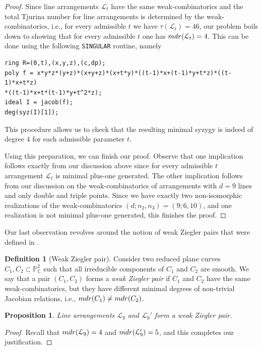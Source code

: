 \documentclass[12pt]{article}
\theoremstyle{plain}
\newtheorem{proposition}[thm]{Proposition}
\theoremstyle{definition}
\newtheorem{definition}[thm]{Definition}
\begin{document}
\begin{proof}
Since line arrangements $\mathcal{L}_{t}$ have the same weak-combinatorics and the total Tjurina number for line arrangements is determined by the weak-combinatorics, i.e., for every admissible $t$ we have $\tau(\mathcal{L}_{t})=46$, our problem boils down to showing that for every admissible $t$ one has ${\rm mdr}(\mathcal{L}_{t}) = 4$. This can be done using the following \verb}SINGULAR} routine, namely
\begin{verbatim}
ring R=(0,t),(x,y,z),(c,dp);
poly f = x*y*z*(y+z)*(x+y+z)*(x+t*y)*((t-1)*x+(t-1)*y+t*z)*((t-1)*x+t*z)
*((t-1)*x+t*(t-1)*y+t^2*z);
ideal I = jacob(f);
deg(syz(I)[1]);
\end{verbatim}
This procedure allows us to check that the resulting minimal syzygy is indeed of degree $4$ for each admissible parameter $t$. 

Using this preparation, we can finish our proof. Observe that one implication follows exactly from our discussion above since for every admissible $t$ arrangement $\mathcal{L}_{t}$ is minimal plus-one generated. The other implication follows from our discussion on the weak-combinatorics of arrangements with $d=9$ lines and only double and triple points. Since we have exactly two non-isomorphic realizations of the weak-combinatorics $(d;n_{2},n_{3}) = (9;6,10)$, and one realization is not minimal plus-one generated, this finishes the proof.
\end{proof}
Our last observation revolves around the notion of weak Ziegler pairs that were defined in \cite{Pokora}.

\begin{definition}[Weak Ziegler pair]
Consider two reduced plane curves $C_{1}, C_{2} \subset \mathbb{P}^{2}_{\mathbb{C}}$ such that all irreducible components of $C_{1}$ and $C_{2}$ are smooth. We say that a pair $(C_{1},C_{2})$ forms a \emph{weak Ziegler pair} if $C_{1}$ and $C_{2}$ have the same weak-combinatorics, but they have different minimal degrees of non-trivial Jacobian relations, i.e., ${\rm mdr}(C_{1}) \neq {\rm mdr}(C_{2})$.
\end{definition}
\begin{proposition}
Line arrangements $\mathcal{L}_{9}$ and $\mathcal{L}_{9}'$ form a weak Ziegler pair.
\end{proposition}
\begin{proof}
Recall that ${\rm mdr}(\mathcal{L}_{9})=4$ and ${\rm mdr}(\mathcal{L}_{9}')=5$, and this completes our justification.
\end{proof}
\end{document}
